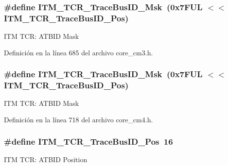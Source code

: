 \subsubsection[{\texorpdfstring{I\+T\+M\+\_\+\+T\+C\+R\+\_\+\+Trace\+Bus\+I\+D\+\_\+\+Msk}{ITM_TCR_TraceBusID_Msk}}]{\setlength{\rightskip}{0pt plus 5cm}\#define I\+T\+M\+\_\+\+T\+C\+R\+\_\+\+Trace\+Bus\+I\+D\+\_\+\+Msk~(0x7\+F\+U\+L $<$$<$ I\+T\+M\+\_\+\+T\+C\+R\+\_\+\+Trace\+Bus\+I\+D\+\_\+\+Pos)}\hypertarget{group___c_m_s_i_s___i_t_m_ga60c20bd9649d1da5a2be8e656ba19a60}{}\label{group___c_m_s_i_s___i_t_m_ga60c20bd9649d1da5a2be8e656ba19a60}
I\+TM T\+CR\+: A\+T\+B\+ID Mask 

Definición en la línea 685 del archivo core\+\_\+cm3.\+h.

\subsubsection[{\texorpdfstring{I\+T\+M\+\_\+\+T\+C\+R\+\_\+\+Trace\+Bus\+I\+D\+\_\+\+Msk}{ITM_TCR_TraceBusID_Msk}}]{\setlength{\rightskip}{0pt plus 5cm}\#define I\+T\+M\+\_\+\+T\+C\+R\+\_\+\+Trace\+Bus\+I\+D\+\_\+\+Msk~(0x7\+F\+U\+L $<$$<$ I\+T\+M\+\_\+\+T\+C\+R\+\_\+\+Trace\+Bus\+I\+D\+\_\+\+Pos)}\hypertarget{group___c_m_s_i_s___i_t_m_ga60c20bd9649d1da5a2be8e656ba19a60}{}\label{group___c_m_s_i_s___i_t_m_ga60c20bd9649d1da5a2be8e656ba19a60}
I\+TM T\+CR\+: A\+T\+B\+ID Mask 

Definición en la línea 718 del archivo core\+\_\+cm4.\+h.

\subsubsection[{\texorpdfstring{I\+T\+M\+\_\+\+T\+C\+R\+\_\+\+Trace\+Bus\+I\+D\+\_\+\+Pos}{ITM_TCR_TraceBusID_Pos}}]{\setlength{\rightskip}{0pt plus 5cm}\#define I\+T\+M\+\_\+\+T\+C\+R\+\_\+\+Trace\+Bus\+I\+D\+\_\+\+Pos~16}\hypertarget{group___c_m_s_i_s___i_t_m_gaca0281de867f33114aac0636f7ce65d3}{}\label{group___c_m_s_i_s___i_t_m_gaca0281de867f33114aac0636f7ce65d3}
I\+TM T\+CR\+: A\+T\+B\+ID Position 


